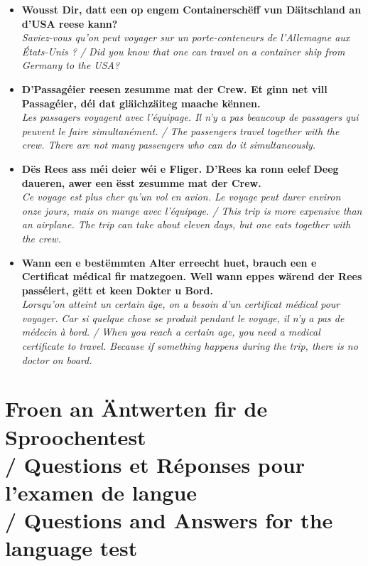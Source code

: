 \begin{itemize}
    \item \textbf{Wousst Dir, datt een op engem Containerschëff vun Däitschland an d'USA reese kann?} \\
    \textit{Saviez-vous qu'on peut voyager sur un porte-conteneurs de l'Allemagne aux États-Unis ? / Did you know that one can travel on a container ship from Germany to the USA?}
    
    \item \textbf{D'Passagéier reesen zesumme mat der Crew. Et ginn net vill Passagéier, déi dat gläichzäiteg maache kënnen.} \\
    \textit{Les passagers voyagent avec l'équipage. Il n'y a pas beaucoup de passagers qui peuvent le faire simultanément. / The passengers travel together with the crew. There are not many passengers who can do it simultaneously.}
    
    \item \textbf{Dës Rees ass méi deier wéi e Fliger. D'Rees ka ronn eelef Deeg daueren, awer een ësst zesumme mat der Crew.} \\
    \textit{Ce voyage est plus cher qu'un vol en avion. Le voyage peut durer environ onze jours, mais on mange avec l'équipage. / This trip is more expensive than an airplane. The trip can take about eleven days, but one eats together with the crew.}
    
    \item \textbf{Wann een e bestëmmten Alter erreecht huet, brauch een e Certificat médical fir matzegoen. Well wann eppes wärend der Rees passéiert, gëtt et keen Dokter u Bord.} \\
    \textit{Lorsqu'on atteint un certain âge, on a besoin d'un certificat médical pour voyager. Car si quelque chose se produit pendant le voyage, il n'y a pas de médecin à bord. / When you reach a certain age, you need a medical certificate to travel. Because if something happens during the trip, there is no doctor on board.}
\end{itemize}

\vspace{1cm}

\section[Froen an Äntwerten fir de Sproochentest]{Froen an Äntwerten fir de Sproochentest \\/ Questions et Réponses pour l'examen de langue \\/ Questions and Answers for the language test}

